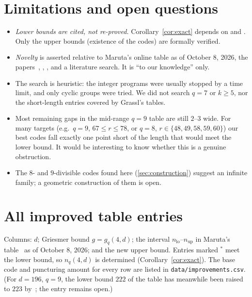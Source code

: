 \documentclass[11pt]{article}
\numberwithin{equation}{section}
\theoremstyle{definition}
\theoremstyle{remark}
\begin{document}
\section{Limitations and open questions}
\begin{itemize}
\item \emph{Lower bounds are cited, not re-proved.} Corollary~\ref{cor:exact} depends on
\cite[Thm.~1.1(4)]{KanazawaMaruta2011} and \cite[Thm.~1.7(4)]{KOM2017}. Only the upper bounds
(existence of the codes) are formally verified.
\item \emph{Novelty} is asserted relative to Maruta's online table as of October 8, 2026, the
papers~\cite{KanazawaMaruta2011,KOM2017,BFM2021,MaLuo2024,KKM2026}, \cite{Grassl}, \cite{MinT}, and a
literature search. It is ``to our knowledge'' only.
\item The search is heuristic: the integer programs were usually stopped by a time limit, and only
cyclic groups were tried. We did not search $q=7$ or $k\ge5$, nor the short-length entries covered by
Grassl's tables.
\item Most remaining gaps in the mid-range $q=9$ table are still $2$--$3$ wide. For many targets
(e.g.\ $q=9$, $67\le r\le 78$, or $q=8$, $r\in\{48,49,58,59,60\}$) our best codes fall exactly one
point short of the length that would meet the lower bound. It would be interesting to know whether
this is a genuine obstruction.
\item The $8$- and $9$-divisible codes found here (\cref{sec:construction}) suggest an infinite family;
a geometric construction of them is open.
\end{itemize}

{\small


}

\appendix
\section{All improved table entries}
Columns: $d$; Griesmer bound $g=g_q(4,d)$; the interval $n_{\mathrm{lo}}$--$n_{\mathrm{up}}$ in
Maruta's table~\cite{MarutaTable} as of October 8, 2026; and the new upper bound. Entries marked
$^{*}$ meet the lower bound, so $n_q(4,d)$ is determined (Corollary~\ref{cor:exact}). The base code and
puncturing amount for every row are listed in \texttt{data/improvements.csv}. (For $d=196$, $q=9$, the
lower bound $222$ of the table has meanwhile been raised to $223$ by~\cite[Thm.~1.3(c)]{KKM2026}; the
entry remains open.)

{\small
\setlength{\tabcolsep}{3.5pt}


}
\end{document}
